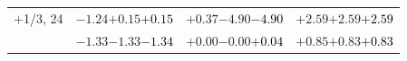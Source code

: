 \documentclass[compress]{beamer}
\begin{document}
\begin{frame}
\begin{tabular}{r | c | c | c}
$+$1/3, 24 & $-1.24$\hspace{0.1 cm}$+0.15$\hspace{0.1 cm}\textcolor{black}{$+0.15$} & $+0.37$\hspace{0.1 cm}$-4.90$\hspace{0.1 cm}\textcolor{black}{$-4.90$} & $+2.59$\hspace{0.1 cm}$+2.59$\hspace{0.1 cm}\textcolor{black}{$+2.59$} \\
           & $-1.33$\hspace{0.1 cm}$-1.33$\hspace{0.1 cm}\textcolor{black}{$-1.34$} & $+0.00$\hspace{0.1 cm}$-0.00$\hspace{0.1 cm}\textcolor{black}{$+0.04$} & $+0.85$\hspace{0.1 cm}$+0.83$\hspace{0.1 cm}\textcolor{black}{$+0.83$} \\
\end{tabular}
\end{frame}
\end{document}
